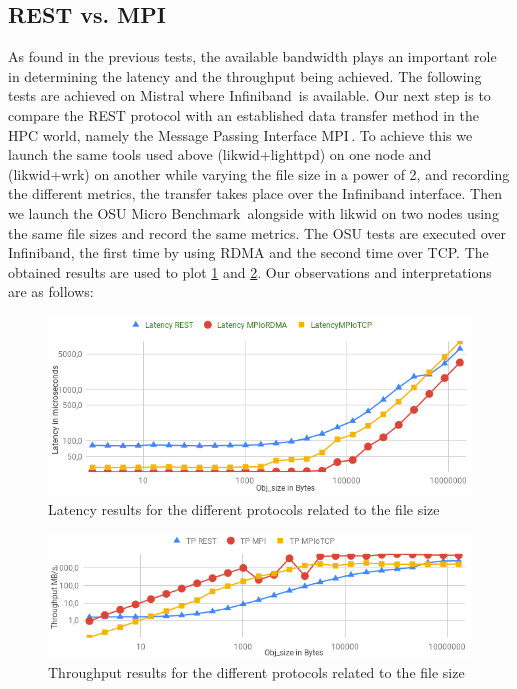 \documentclass[runningheads]{llncs}
\begin{document}
\subsection{REST vs. MPI}\label{subsec:tcpib}
As found in the previous tests, the available bandwidth plays an important role in determining the latency and the throughput being achieved. The following tests are achieved on Mistral where Infiniband\,\cite{Infiniband} is available.
Our next step is to compare the REST protocol with an established data transfer method in the HPC world, namely the Message Passing Interface MPI\,\cite{MPI}.
To achieve this we launch the same tools used above (likwid+lighttpd) on one node and (likwid+wrk) on another while varying the file size in a power of 2, and recording the different metrics, the transfer takes place over the Infiniband interface.
Then we launch the OSU Micro Benchmark\,\cite{osumicrobenchmark} alongside with likwid on two nodes using the same file sizes and record the same metrics. The OSU tests are executed over Infiniband, the first time by using RDMA and the second time over TCP.
The obtained results are used to plot \cref{fig:latency-rest-mpi} and \cref{fig:throughput-rest-mpi}. Our observations and interpretations are as follows:
\begin{figure}
\includegraphics[width=\textwidth]{latency-rest-mpi.png}\vspace{-1em}
\caption{Latency results for the different protocols related to the file size} \label{fig:latency-rest-mpi}\vspace{-1.5em}
\end{figure}
\begin{figure}
\includegraphics[width=\textwidth]{throughput-rest-mpi.png}\vspace{-1em}
\caption{Throughput results for the different protocols related to the file size} \label{fig:throughput-rest-mpi}\vspace{-1.5em}
\end{figure}
\end{document}

